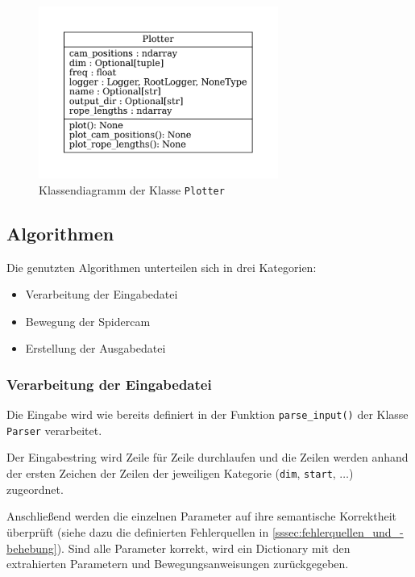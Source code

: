 \begin{figure}[H]
    \centering
    \includegraphics[width=0.7\textwidth]{../python/uml/plotter.pdf}
    \caption{Klassendiagramm der Klasse \texttt{Plotter}}
    \label{fig:plotter}
\end{figure}

\subsection{Algorithmen}
\label{ssec:algorithmen}

Die genutzten Algorithmen unterteilen sich in drei Kategorien:
\begin{itemize}
    \item Verarbeitung der Eingabedatei
    \item Bewegung der Spidercam
    \item Erstellung der Ausgabedatei
\end{itemize}

\subsubsection{Verarbeitung der Eingabedatei}
\label{sssec:verarbeitung_der_eingabedatei}

Die Eingabe wird wie bereits definiert in der Funktion \texttt{parse\_input()} der Klasse \texttt{Parser} verarbeitet.

Der Eingabestring wird Zeile für Zeile durchlaufen und die Zeilen werden anhand der ersten Zeichen der Zeilen der jeweiligen Kategorie (\texttt{dim}, \texttt{start}, $\ldots$) zugeordnet.

Anschließend werden die einzelnen Parameter auf ihre semantische Korrektheit überprüft (siehe dazu die definierten Fehlerquellen in \ref{sssec:fehlerquellen_und_-behebung}).
Sind alle Parameter korrekt, wird ein Dictionary mit den extrahierten Parametern und Bewegungsanweisungen zurückgegeben.

